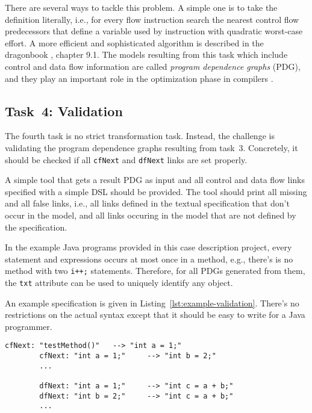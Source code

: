 \documentclass[submission]{eptcs}
\begin{document}
There are several ways to tackle this problem.  A simple one is to take the
definition literally, i.e., for every flow instruction search the nearest
control flow predecessors that define a variable used by instruction with
quadratic worst-case effort.  A more efficient and sophisticated algorithm is
described in the dragonbook \cite{Aho:CPTT}, chapter 9.1.  The models resulting
from this task which include control and data flow information are called
\emph{program dependence graphs} (PDG), and they play an important role in the
optimization phase in compilers \cite{Ferrante:1987:PDG:24039.24041}.


\subsection*{Task~4: Validation}
\label{sec:task4-validation}

The fourth task is no strict transformation task.  Instead, the challenge is
validating the program dependence graphs resulting from task~3.  Concretely, it
should be checked if all \verb|cfNext| and \verb|dfNext| links are set
properly.

A simple tool that gets a result PDG as input and all control and data flow
links specified with a simple DSL should be provided.  The tool should print
all missing and all false links, i.e., all links defined in the textual
specification that don't occur in the model, and all links occuring in the
model that are not defined by the specification.

In the example Java programs provided in this case description project, every
statement and expressions occurs at most once in a method, e.g., there's is no
method with two \verb|i++;| statements.  Therefore, for all PDGs generated from
them, the \verb|txt| attribute can be used to uniquely identify any object.

An example specification is given in Listing~\ref{lst:example-validation}.
There's no restrictions on the actual syntax except that it should be easy to
write for a Java programmer.

\begin{lstlisting}[caption={An example validation DSL for result PDGs},label={lst:example-validation}]
        cfNext: "testMethod()"   --> "int a = 1;"
        cfNext: "int a = 1;"     --> "int b = 2;"
        ...

        dfNext: "int a = 1;"     --> "int c = a + b;"
        dfNext: "int b = 2;"     --> "int c = a + b;"
        ...
\end{lstlisting}
\end{document}
